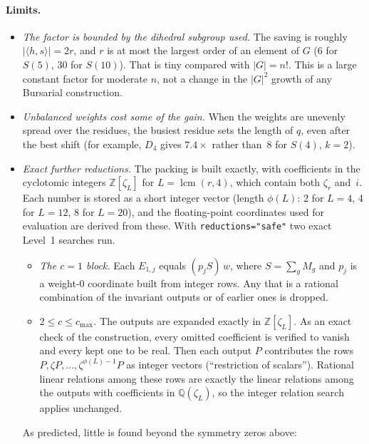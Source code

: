 \documentclass[11pt]{article}
\theoremstyle{definition}
\theoremstyle{remark}
\begin{document}
\paragraph{Limits.}
\begin{itemize}
  \item \emph{The factor is bounded by the dihedral subgroup used.} The saving
    is roughly $|\langle h, s\rangle| = 2r$, and $r$ is at most the largest
    order of an element of $G$ (6 for $S(5)$, 30 for $S(10)$). That is tiny
    compared with $|G| = n!$. This is a large constant factor for moderate
    $n$, not a change in the $|G|^2$ growth of any Bursarial construction.
  \item \emph{Unbalanced weights cost some of the gain.} When the weights are
    unevenly spread over the residues, the busiest residue sets the length of
    $q$, even after the best shift (for example, $D_4$ gives $7.4\times$ rather
    than~8 for $S(4)$, $k = 2$).
  \item \emph{Exact further reductions.} The packing is built exactly, with
    coefficients in the cyclotomic integers $\mathbb{Z}[\zeta_L]$ for
    $L = \operatorname{lcm}(r, 4)$, which contain both $\zeta_r$ and~$i$. Each
    number is stored as a short integer vector (length $\phi(L)$: 2 for
    $L = 4$, 4 for $L = 12$, 8 for $L = 20$), and the floating-point coordinates
    used for evaluation are derived from these. With
    \texttt{reductions="safe"} two exact Level~1 searches run.
    \begin{itemize}
      \item \emph{The $c = 1$ block.} Each $E_{1,j}$ equals $(p_j S)\,w$, where
        $S = \sum_g M_g$ and $p_j$ is a weight-0 coordinate built from integer
        rows. Any that is a rational combination of the invariant outputs or of
        earlier ones is dropped.
      \item \emph{$2 \le c \le c_{\max}$.} The outputs are expanded exactly in
        $\mathbb{Z}[\zeta_L]$. As an exact check of the construction, every
        omitted coefficient is verified to vanish and every kept one to be
        real. Then each output $P$ contributes the rows
        $P, \zeta P, \ldots, \zeta^{\phi(L)-1} P$ as integer vectors (``restriction
        of scalars''). Rational linear relations among these rows are exactly
        the linear relations among the outputs with coefficients in
        $\mathbb{Q}(\zeta_L)$, so the integer relation search applies unchanged.
    \end{itemize}
    As predicted, little is found beyond the symmetry zeros above:

\end{itemize}
\end{document}
